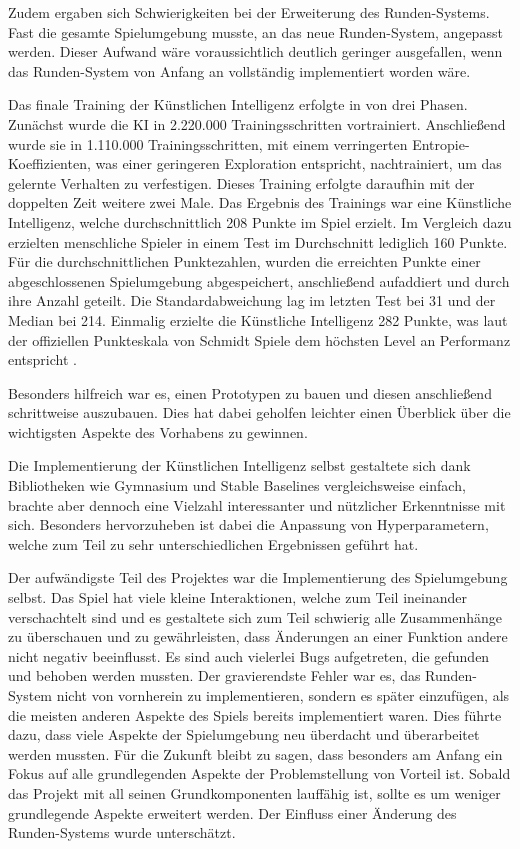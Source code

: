 Zudem ergaben sich Schwierigkeiten bei der Erweiterung des Runden-Systems. Fast die gesamte Spielumgebung musste, an das neue Runden-System, angepasst werden. Dieser Aufwand wäre voraussichtlich deutlich geringer ausgefallen, wenn das Runden-System von Anfang an vollständig implementiert worden wäre.

Das finale Training der Künstlichen Intelligenz erfolgte in von drei Phasen. Zunächst wurde die KI in 2.220.000 Trainingsschritten vortrainiert. Anschließend wurde sie in 1.110.000 Trainingsschritten, mit einem verringerten Entropie-Koeffizienten, was einer geringeren Exploration entspricht, nachtrainiert, um das gelernte Verhalten zu verfestigen. Dieses Training erfolgte daraufhin mit der doppelten Zeit weitere zwei Male. Das Ergebnis des Trainings war eine Künstliche Intelligenz, welche durchschnittlich 208 Punkte im Spiel erzielt. Im Vergleich dazu erzielten menschliche Spieler in einem Test im Durchschnitt lediglich 160 Punkte. Für die durchschnittlichen Punktezahlen, wurden die erreichten Punkte einer abgeschlossenen Spielumgebung abgespeichert, anschließend aufaddiert und durch ihre Anzahl geteilt. Die Standardabweichung lag im letzten Test bei 31 und der Median bei 214. Einmalig erzielte die Künstliche Intelligenz 282 Punkte, was laut der offiziellen Punkteskala von Schmidt Spiele dem höchsten Level an Performanz entspricht \cite{noauthor_49340_ganz_schoen_clever_anleitung_final9_nodate}.

Besonders hilfreich war es, einen Prototypen zu bauen und diesen anschließend schrittweise auszubauen. Dies hat dabei geholfen leichter einen Überblick über die wichtigsten Aspekte des Vorhabens zu gewinnen. 

Die Implementierung der Künstlichen Intelligenz selbst gestaltete sich dank Bibliotheken wie Gymnasium und Stable Baselines vergleichsweise einfach, brachte aber dennoch eine Vielzahl interessanter und nützlicher Erkenntnisse mit sich. Besonders hervorzuheben ist dabei die Anpassung von Hyperparametern, welche zum Teil zu sehr unterschiedlichen Ergebnissen geführt hat. 

Der aufwändigste Teil des Projektes war die Implementierung des Spielumgebung selbst. Das Spiel hat viele kleine Interaktionen, welche zum Teil ineinander verschachtelt sind und es gestaltete sich zum Teil schwierig alle Zusammenhänge zu überschauen und zu gewährleisten, dass Änderungen an einer Funktion andere nicht negativ beeinflusst. Es sind auch vielerlei Bugs aufgetreten, die gefunden und behoben werden mussten. Der gravierendste Fehler war es, das Runden-System nicht von vornherein zu implementieren, sondern es später einzufügen, als die meisten anderen Aspekte des Spiels bereits implementiert waren. Dies führte dazu, dass viele Aspekte der Spielumgebung neu überdacht und überarbeitet werden mussten. Für die Zukunft bleibt zu sagen, dass besonders am Anfang ein Fokus auf alle grundlegenden Aspekte der Problemstellung von Vorteil ist. Sobald das Projekt mit all seinen Grundkomponenten lauffähig ist, sollte es um weniger grundlegende Aspekte erweitert werden. Der Einfluss einer Änderung des Runden-Systems wurde unterschätzt.\\

